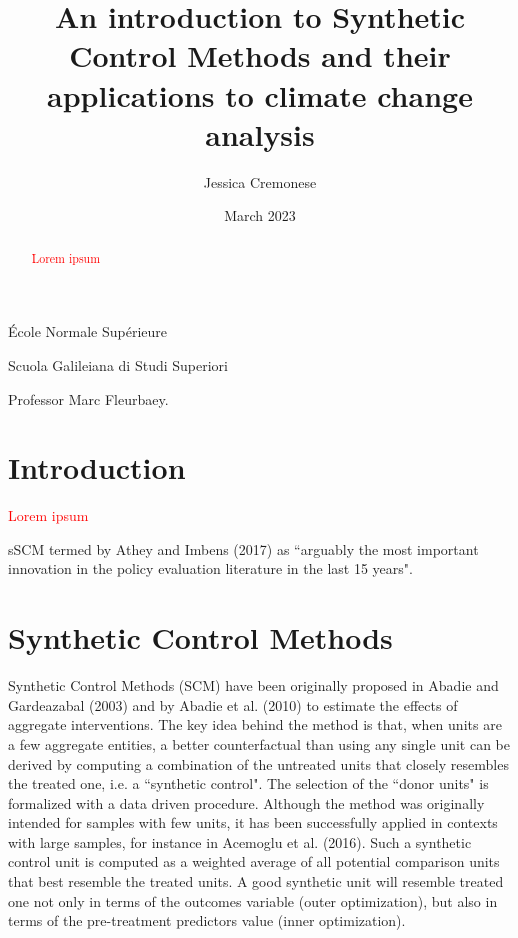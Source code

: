 \documentclass[12pt,a4paper,draft]{article}
\begin{document}
\begin{titlepage}
\title{An introduction to Synthetic Control Methods and their applications to climate change analysis}
\author{Jessica Cremonese}
\date{March 2023}
\maketitle

\vspace{2cm}

\begin{center}
    École Normale Supérieure
\end{center}

\begin{center}
    Scuola Galileiana di Studi Superiori
\end{center}

\vspace{5cm}
Professor Marc Fleurbaey.


\end{titlepage}

\tableofcontents

\newpage
\begin{abstract}
    \textcolor{red}{Lorem ipsum}
\end{abstract}
\newpage


\section{Introduction}

\textcolor{red}{Lorem ipsum}

sSCM termed by Athey and Imbens (2017) as ``arguably the most important innovation in the 
policy evaluation literature in the last 15 years".







\section{Synthetic Control Methods}

Synthetic Control Methods (SCM) have been originally proposed in Abadie and Gardeazabal 
(2003) and by Abadie et al. (2010) to estimate the effects of aggregate interventions.
The key idea behind the method is that, when units are a few aggregate entities, 
a better counterfactual than using any single unit can be derived by computing a 
combination of the untreated units that closely resembles the treated one, i.e. 
a ``synthetic control". The selection of the ``donor units" is formalized with a data
driven procedure.
Although the method was originally intended for samples with few units, it has been 
successfully applied in contexts with large samples, for instance in Acemoglu et 
al. (2016).
Such a synthetic control unit is computed as a weighted average of all potential 
comparison units that best resemble the treated units. A good synthetic unit will 
resemble treated one not only in terms of the outcomes variable (outer optimization), 
but also in terms of the pre-treatment predictors value (inner optimization).
\end{document}
